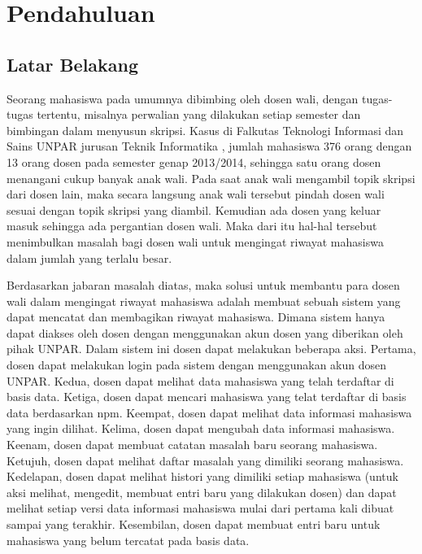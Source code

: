 \chapter{Pendahuluan}
\label{chap:pendahuluan}

\section{Latar Belakang}
\label{sec:latarbelakang}

Seorang mahasiswa pada umumnya dibimbing oleh dosen wali, dengan tugas-tugas tertentu, misalnya perwalian yang dilakukan setiap semester dan bimbingan dalam menyusun skripsi. Kasus di Falkutas Teknologi Informasi dan Sains UNPAR jurusan Teknik Informatika \cite{Ftis:2014}, jumlah mahasiswa 376 orang dengan 13 orang dosen pada semester genap 2013/2014, sehingga satu orang dosen menangani cukup banyak anak wali. Pada saat anak wali mengambil topik skripsi dari dosen lain, maka secara langsung anak wali tersebut pindah dosen wali sesuai dengan topik skripsi yang diambil. Kemudian ada dosen yang keluar masuk sehingga ada pergantian dosen wali. Maka dari itu hal-hal tersebut menimbulkan masalah bagi dosen wali untuk mengingat riwayat mahasiswa dalam jumlah yang terlalu besar.

Berdasarkan jabaran masalah diatas, maka solusi untuk membantu para dosen wali dalam mengingat riwayat mahasiswa adalah membuat sebuah sistem yang dapat mencatat dan membagikan riwayat mahasiswa. Dimana sistem hanya dapat diakses oleh dosen dengan menggunakan akun dosen yang diberikan oleh pihak UNPAR. Dalam sistem ini dosen dapat melakukan beberapa aksi. Pertama, dosen dapat melakukan login pada sistem dengan menggunakan akun dosen UNPAR. Kedua, dosen dapat melihat data mahasiswa yang telah terdaftar di basis data. Ketiga, dosen dapat mencari mahasiswa yang telat terdaftar di basis data berdasarkan npm. Keempat, dosen dapat melihat data informasi mahasiswa yang ingin dilihat. Kelima, dosen dapat mengubah data informasi mahasiswa. Keenam, dosen dapat membuat catatan masalah baru seorang mahasiswa. Ketujuh, dosen dapat melihat daftar masalah yang dimiliki seorang mahasiswa. Kedelapan, dosen dapat melihat histori yang dimiliki setiap mahasiswa (untuk aksi melihat, mengedit, membuat entri baru yang dilakukan dosen) dan dapat melihat setiap versi data informasi mahasiswa mulai dari pertama kali dibuat sampai yang terakhir. Kesembilan, dosen dapat membuat entri baru untuk mahasiswa yang belum tercatat pada basis data. 

